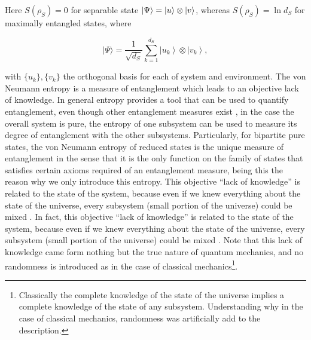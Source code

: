 \indent  Here $S(\rho_S)= 0$ for separable state $\mathinner{|{\Psi}\rangle} = \mathinner{|{u}\rangle}\otimes\mathinner{|{v}\rangle}$, whereas $S(\rho_S)=\ln d_S$ for maximally entangled states, where

\begin{equation}
|\Psi\rangle=\frac{1}{\sqrt{d_{S}}} \sum_{k=1}^{d_{S}}\left|u_{k}\right\rangle \otimes\left|v_{k}\right\rangle,
\label{CH1:spearable_state}
\end{equation}

with $\{u_k\}, \{v_k\}$ the orthogonal basis for each of system and environment.
The von Neumann entropy is a measure of entanglement which leads to an objective lack of knowledge. In general entropy provides a tool that can be used to quantify entanglement, even though other entanglement measures exist \cite{plenio_introduction_2006}, in the case the overall system is pure, the entropy of one subsystem can be used to measure its degree of entanglement with the other subsystems. Particularly, for bipartite pure states, the von Neumann entropy of reduced states is the unique measure of entanglement in the sense that it is the only function on the family of states that satisfies certain axioms required of an entanglement measure, being this the reason why we only introduce this entropy.  This objective ``lack of knowledge'' is related to the state of the system, because even if we knew everything about the state of the universe, every subsystem (small portion of the universe) could be mixed \cite{gemmer_distribution_2003, page_average_1993}. In fact, this objective ``lack of knowledge'' is related to the state of the system, because even if we knew everything about the state of the universe, every subsystem (small portion of the universe) could be mixed \cite{gemmer_distribution_2003,page_average_1993}. Note that this lack of knowledge came form nothing but the true nature of quantum mechanics, and no randomness is introduced as in the case of classical mechanics\footnote{Classically the complete knowledge of the state of the universe implies a complete knowledge of the state of any subsystem. Understanding why in the case of classical mechanics, randomness was artificially add to the description.}.\\



